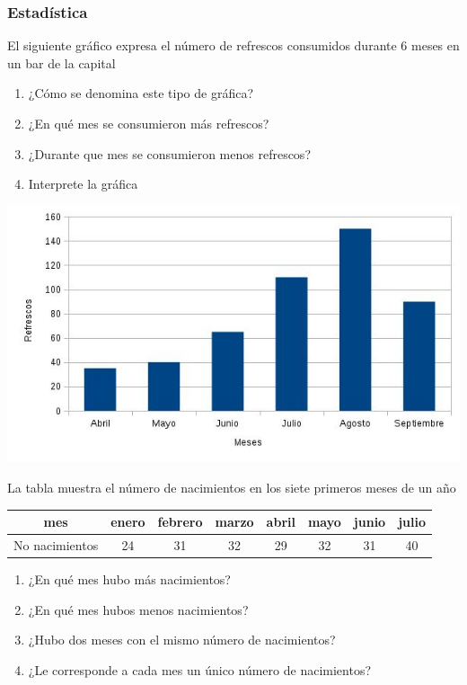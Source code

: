 \documentclass[letterpaper,11pt,twoside]{article}
\begin{document}
\begin{enumerate}
\subsubsection*{Estad\'{i}stica}
\begin{minipage}{.4\textwidth}
\item El siguiente gr\'{a}fico expresa el n\'{u}mero de refrescos consumidos durante 6 meses en un bar de la capital
\begin{enumerate}
\item ¿Cómo se denomina este tipo de gráfica?
\item ¿En qué mes se consumieron más refrescos?
\item ¿Durante que mes se consumieron menos refrescos?
\item Interprete la gráfica
\end{enumerate}
\end{minipage} \hfill
\begin{minipage}{.55\textwidth}
\includegraphics[scale=.5]{Images/refrescos.jpg}  
\end{minipage}
\item La tabla muestra el número de nacimientos en los siete primeros meses de un año
\begin{center}
\begin{tabular}{|c|c|c|c|c|c|c|c|}
\hline 
mes & enero & febrero & marzo & abril & mayo & junio & julio \\ 
\hline 
No nacimientos & 24 & 31 & 32 & 29 & 32 & 31 & 40 \\ 
\hline 
\end{tabular} 
\end{center}
\begin{enumerate}
\item ¿En qué mes hubo más nacimientos?
\item ¿En qué mes hubos menos nacimientos?
\item ¿Hubo dos meses con el mismo número de nacimientos?
\item ¿Le corresponde a cada mes un único número de nacimientos?
\end{enumerate}
\end{enumerate}
\end{document}
